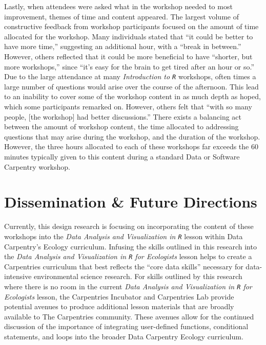 \documentclass[12pt]{article}
\begin{document}
\quad Lastly, when attendees were asked what in the workshop needed to most improvement, themes of time and content appeared. The largest volume of constructive feedback from workshop participants focused on the amount of time allocated for the workshop. Many individuals stated that ``it could be better to have more time,'' suggesting an additional hour, with a ``break in between.'' However, others reflected that it could be more beneficial to have ``shorter, but more workshops,'' since ``it's easy for the brain to get tired after an hour or so.'' Due to the large attendance at many \emph{Introduction to \texttt{R}} workshops, often times a large number of questions would arise over the course of the afternoon. This lead to an inability to cover some of the workshop content in as much depth as hoped, which some participants remarked on. However, others felt that ``with so many people, [the workshop] had better discussions.'' There exists a balancing act between the amount of workshop content, the time allocated to addressing questions that may arise during the workshop, and the duration of the workshop. However, the three hours allocated to each of these workshops far exceeds the 60 minutes typically given to this content during a standard Data or Software Carpentry workshop. 

\section{Dissemination \& Future Directions} 
\label{sec:future}

\quad Currently, this design research is focusing on incorporating the content of these workshops into the \emph{Data Analysis and Visualization in \texttt{R}} lesson within Data Carpentry's Ecology curriculum. Infusing the skills outlined in this research into the \emph{Data Analysis and Visualization in \texttt{R} for Ecologists} lesson helps to create a Carpentries curriculum that best reflects the ``core data skills'' necessary for data-intensive environmental science research. For skills outlined by this research where there is no room in the current \emph{Data Analysis and Visualization in \texttt{R} for Ecologists} lesson, the Carpentries Incubator and Carpentries Lab provide potential avenues to produce additional lesson materials that are broadly available to The Carpentries community. These avenues allow for the continued discussion of the importance of integrating user-defined functions, conditional statements, and loops into the broader Data Carpentry Ecology curriculum.    
\end{document}

